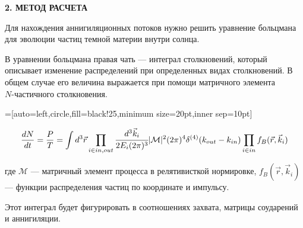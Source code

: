 \newpage
\begin{center}
	\textbf{\large 2. МЕТОД РАСЧЕТА}
\end{center}


Для нахождения аннигиляционных потоков нужно решить уравнение больцмана для 
эволюции частиц темной материи внутри солнца.

В уравнении больцмана правая чать --- интеграл столкновений, 
который описывает изменение распределений при определенных видах столкновений.
В общем случае его величина выражается при помощи матричного элемента \\
$N$-частичного столкновения.

=[auto=left,circle,fill=black!25,minimum size=20pt,inner sep=10pt]

\begin{equation}
	\label{st_common}
	\frac{dN}{dt} = \frac{P}{T} = \int d^3\vec{r} \prod_{i \in in,out} \cfrac{d^3\vec{k}_i}{2 E_i (2\pi)^3} |\mathcal{M}|^2 (2\pi)^4 \delta^{(4)}(k_{out} - k_{in}) \prod_{i \in in} f_B(\vec{r},\vec{k}_i)
\end{equation}

где $\mathcal{M}$ ---  матричный элемент процесса в релятивисткой нормировке,
$f_B(\vec{r},\vec{k}_i)$ --- функции распределения частиц по координате и импульсу.

Этот интеграл будет фигурировать в соотношениях захвата, матрицы соударений и аннигиляции.

